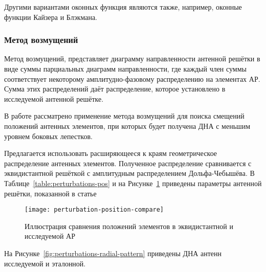 Другими вариантами оконных функция являются также, например, оконные функции Кайзера и Блэкмана.


\subsubsection{Метод возмущений}\label{sec:perturbations-method}

Метод возмущений, представляет диаграмму направленности антенной решётки в виде суммы
парциальных диаграмм направленности, где каждый член суммы соответствует некоторому
амплитудно-фазовому распределению на элементах АР.
Сумма этих распределений даёт распределение, которое установлено в исследуемой антенной решётке.

В работе \cite{harrington1961sidelobe} рассматрено применение метода возмущений
для поиска смещений положений антенных элементов, при которых будет получена
ДНА с меньшим уровнем боковых лепестков.

Предлагается использовать расширяющееся к краям геометрическое распределение антенных элементов.
Полученное распределение сравнивается с эквидистантной решёткой с амплитудным распределением
Дольфа-Чебышёва. В Таблице~\ref{table:perturbations-pos} и на Рисунке~\ref{fig:perturbation-position-compare} приведены параметры антенной решётки, показанной в статье

\begin{table}[H]
    \caption{Относительные смещения элементов}\label{table:perturbations-pos}
\end{table}

\begin{figure}[H]
    \centering
    \texttt{[image: perturbation-position-compare]}
    \caption{Иллюстрация сравнения положений элементов в эквидистантной и исследуемой АР}%
    \label{fig:perturbation-position-compare}
\end{figure}

На Рисунке~\ref{fig:perturbations-radial-pattern} приведены ДНА антенн исследуемой и эталонной.

